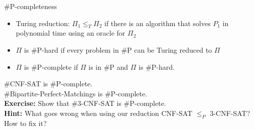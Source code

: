 \begin{frame}{\#P-completeness}

	\begin{itemize}
		\item \alert{Turing reduction}: $\Pi_1 \le_T \Pi_2$ if there is an algorithm that solves $P_1$ in polynomial time using an oracle for $\Pi_2$
		\item $\Pi$ is \#P-hard if every problem in \#P can be Turing reduced to $\Pi$
		\item $\Pi$ is \#P-complete if $\Pi$ is in \#P and $\Pi$ is \#P-hard.
	\end{itemize}

	\bigskip
	\pause
	\#CNF-SAT is \#P-complete.\\
	\#Bipartite-Perfect-Matchings is \#P-complete.\\
	\bigskip
	\pause
	\textbf{Exercise:} Show that \#3-CNF-SAT is \#P-complete.\\
	\pause
	\textbf{Hint:} What goes wrong when using our reduction CNF-SAT $\le_P$ 3-CNF-SAT? How to fix it?

\end{frame}







